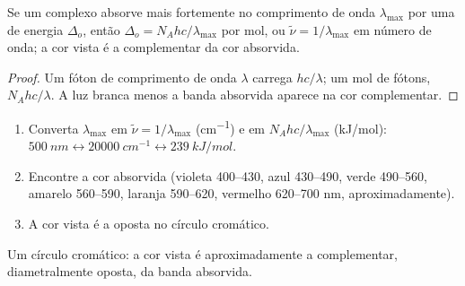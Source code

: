 \begin{proposition}\label{prop:b2:ligand-field:colour}
Se um complexo absorve mais fortemente no comprimento de onda $\lambda_{\max}$ por
uma  de energia $\Delta_o$, então $\Delta_o = N_Ahc/\lambda_{\max}$ por
mol, ou $\tilde\nu = 1/\lambda_{\max}$ em número de onda; a cor vista é a
complementar da cor absorvida.
\end{proposition}

\begin{proof}
Um fóton de comprimento de onda $\lambda$ carrega $hc/\lambda$; um mol de fótons, $N_Ahc/\lambda$. A
luz branca menos a banda absorvida aparece na cor complementar.
\end{proof}

\begin{method}\label{met:b2:ligand-field:colour}
\begin{enumerate}
  \item Converta $\lambda_{\max}$ em $\tilde\nu = 1/\lambda_{\max}$ (\unit{cm^{-1}}) e em
        $N_Ahc/\lambda_{\max}$ (\unit{kJ/mol}): $\qty{500}{nm} \leftrightarrow \qty{20000}{cm^{-1}}
        \leftrightarrow \qty{239}{kJ/mol}$.
  \item Encontre a cor absorvida (violeta 400--430, azul 430--490, verde 490--560,
        amarelo 560--590, laranja 590--620, vermelho 620--700 nm, aproximadamente).
  \item A cor vista é a oposta no círculo cromático.
\end{enumerate}
\end{method}

\begin{omfigure}

{\small Um círculo cromático: a cor vista é aproximadamente a complementar,
diametralmente oposta, da banda absorvida.}
\end{omfigure}

